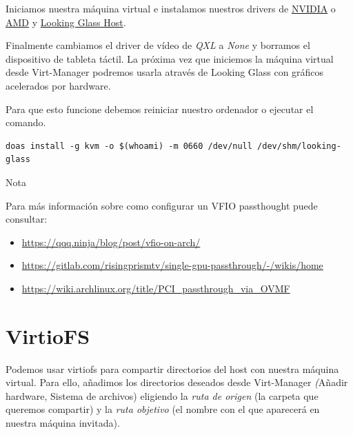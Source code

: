 \documentclass[11pt]{article}
\begin{document}
Iniciamos nuestra máquina virtual e instalamos nuestros drivers de \href{https://www.nvidia.es/Download/index.aspx?lang=es}{NVIDIA} o \href{https://www.amd.com/es/support}{AMD} y \href{https://looking-glass.io/downloads}{Looking Glass Host}.

\vspace{5pt}

Finalmente cambiamos el driver de vídeo de \emph{QXL} a \emph{None} y borramos el dispositivo de tableta táctil. La próxima vez que iniciemos la máquina virtual desde Virt-Manager podremos usarla através de Looking Glass con gráficos acelerados por hardware.

\noindent Para que esto funcione debemos reiniciar nuestro ordenador o ejecutar el comando.

\begin{verbatim}
doas install -g kvm -o $(whoami) -m 0660 /dev/null /dev/shm/looking-glass
\end{verbatim}

\begin{mybox}{Nota}

	Para más información sobre como configurar un VFIO passthought puede consultar:

	\vspace{-7.5pt}

	\begin{itemize}
		\setlength\itemsep{-0.3em}
		\item \href{https://qqq.ninja/blog/post/vfio-on-arch/}
		      {https://qqq.ninja/blog/post/vfio-on-arch/}
		\item \href{https://gitlab.com/risingprismtv/single-gpu-passthrough/-/wikis/home}
		      {https://gitlab.com/risingprismtv/single-gpu-passthrough/-/wikis/home}
		\item \href{https://wiki.archlinux.org/title/PCI\_passthrough\_via\_OVMF}
		      {https://wiki.archlinux.org/title/PCI\_passthrough\_via\_OVMF}
	\end{itemize}
\end{mybox}

\section{VirtioFS}

Podemos usar virtiofs para compartir directorios del host con nuestra máquina virtual. Para ello, añadimos los directorios deseados desde Virt-Manager \emph(Añadir hardware, Sistema de archivos) eligiendo la \emph{ruta de origen} (la carpeta que queremos compartir) y la \emph{ruta objetivo} (el nombre con el que aparecerá en nuestra máquina invitada).
\end{document}
